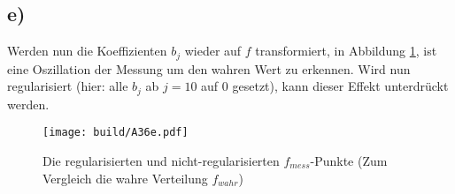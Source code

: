 \subsection*{e)}
Werden nun die Koeffizienten $b_j$ wieder auf $f$ transformiert, in Abbildung \ref{fig:A36e}, ist eine Oszillation der Messung um den wahren Wert zu erkennen.
Wird nun regularisiert (hier: alle $b_j$ ab $j=10$ auf $0$ gesetzt), kann dieser Effekt unterdrückt werden.
\begin{figure}
    \centering
    \texttt{[image: build/A36e.pdf]}
    \caption{Die regularisierten und nicht-regularisierten $f_{mess}$-Punkte (Zum Vergleich die wahre Verteilung $f_{wahr}$)}
    \label{fig:A36e}
\end{figure}
